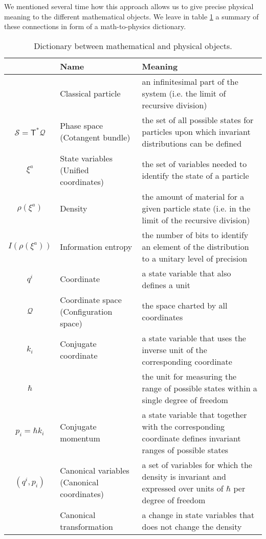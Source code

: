 \documentclass[11pt]{article}
\begin{document}
We mentioned several time how this approach allows us to give precise physical meaning to the different mathematical objects. We leave in table \ref{dictionary} a summary of these connections in form of a math-to-physics dictionary.
\begin{table}[h!]
	\centering
	\begin{tabular}{c p{} p{} }
		& Name & Meaning\\ 
		\hline 
		& Classical particle & an infinitesimal part of the system (i.e. the limit of recursive division) \\ 
		$\mathcal{S} =\mathsf{T}^*\mathcal{Q}$ & Phase space \newline (Cotangent bundle) & the set of all possible states for particles upon which invariant distributions can be defined \\
		$\xi^a$ & State variables \newline (Unified coordinates) & the set of variables needed to identify the state of a particle \\ 
		$\rho(\xi^a)$ & Density & the amount of material for a given particle state (i.e. in the limit of the recursive division)\\ 
		$I(\rho(\xi^a))$ & Information entropy & the number of bits to identify an element of the distribution to a unitary level of precision\\ 
		$q^i$ & Coordinate & a state variable that also defines a unit \\
		$\mathcal{Q}$ & Coordinate space \newline (Configuration space) & the space charted by all coordinates \\
		$k_i$ & Conjugate coordinate & a state variable that uses the inverse unit of the corresponding coordinate \\
		$\hbar$ & & the unit for measuring the range of possible states within a single degree of freedom \\
		$p_i=\hbar k_i$ & Conjugate momentum & a state variable that together with the corresponding coordinate defines invariant ranges of possible states \\
		$(q^i, p_i)$ & Canonical variables \newline (Canonical coordinates) & a set of variables for which the density is invariant and expressed over units of $\hbar$ per degree of freedom\\ 
		& Canonical transformation & a change in state variables that does not change the density\\ 
	\end{tabular}
	\caption{Dictionary between mathematical and physical objects.}
	\label{dictionary}
\end{table}
\end{document}
